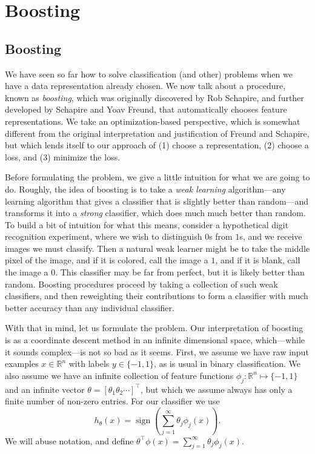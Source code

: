 \titlespacing*{\chapter}{0pt}{-10pt}{20pt}
\chapter{Boosting}\label{cha:boosting}


\section{Boosting}

We have seen so far how to solve classification (and other) problems when we
have a data representation already chosen. We now talk about a procedure,
known as \textit{boosting}, which was originally discovered by Rob Schapire, and
further developed by Schapire and Yoav Freund, that automatically chooses
feature representations. We take an optimization-based perspective, which
is somewhat different from the original interpretation and justification of
Freund and Schapire, but which lends itself to our approach of (1) choose a
representation, (2) choose a loss, and (3) minimize the loss.

Before formulating the problem, we give a little intuition for what we
are going to do. Roughly, the idea of boosting is to take a \textit{weak learning}
algorithm---any learning algorithm that gives a classifier that is slightly
better than random---and transforms it into a \textit{strong} classifier, which does much
much better than random. To build a bit of intuition for what this means,
consider a hypothetical digit recognition experiment, where we wish to
distinguish $0$s from $1$s, and we receive images we must classify. Then a natural
weak learner might be to take the middle pixel of the image, and if it is
colored, call the image a $1$, and if it is blank, call the image a $0$. This
classifier may be far from perfect, but it is likely better than random. Boosting
procedures proceed by taking a collection of such weak classifiers, and then
reweighting their contributions to form a classifier with much better accuracy
than any individual classifier.

With that in mind, let us formulate the problem. Our interpretation of
boosting is as a coordinate descent method in an infinite dimensional space,
which---while it sounds complex---is not so bad as it seems. First, we assume
we have raw input examples $x \in \mathbb R^n$ with labels $y \in \{-1,1\}$, as is usual in
binary classification. We also assume we have an infinite collection of feature
functions $\phi_j : \mathbb R^n \mapsto \{-1,1\}$ and an infinite vector $\theta = [\theta_1 \theta_2 \cdots]^\top$, but
which we assume always has only a finite number of non-zero entries. For
our classifier we use
\[
h_\theta (x) = \operatorname{sign}\left(\sum_{j=1}^\infty \theta_j \phi_j (x) \right).
\]
We will abuse notation, and define $\theta^\top \phi(x) = \sum_{j=1}^\infty \theta_j \phi_j (x)$.

